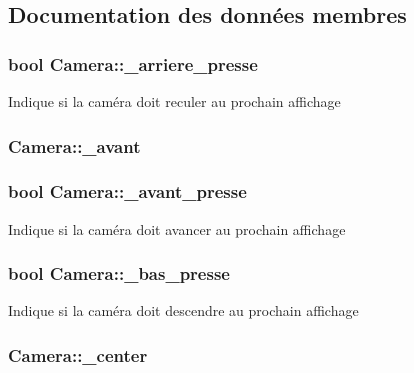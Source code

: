 \subsection{Documentation des données membres}
\hypertarget{class_camera_a0ce12f74953fcd53192e48f8b4164e2e}{
\subsubsection[{\+\_\+arriere\+\_\+presse}]{\setlength{\rightskip}{0pt plus 5cm}bool Camera\+::\+\_\+arriere\+\_\+presse}}\label{class_camera_a0ce12f74953fcd53192e48f8b4164e2e}
Indique si la caméra doit reculer au prochain affichage \hypertarget{class_camera_ab7cf8c1eae6b2f35a20e8abd1f0570c9}{
\subsubsection[{\+\_\+avant}]{ Camera\+::\+\_\+avant\hspace{0.3cm}{\ttfamily [protected]}}}\label{class_camera_ab7cf8c1eae6b2f35a20e8abd1f0570c9}
\hypertarget{class_camera_a4cab15e35a96fdcb2a8599fea13a9b8f}{
\subsubsection[{\+\_\+avant\+\_\+presse}]{\setlength{\rightskip}{0pt plus 5cm}bool Camera\+::\+\_\+avant\+\_\+presse}}\label{class_camera_a4cab15e35a96fdcb2a8599fea13a9b8f}
Indique si la caméra doit avancer au prochain affichage \hypertarget{class_camera_aaba6828f97c9ef07b6b135a665bd3008}{
\subsubsection[{\+\_\+bas\+\_\+presse}]{\setlength{\rightskip}{0pt plus 5cm}bool Camera\+::\+\_\+bas\+\_\+presse}}\label{class_camera_aaba6828f97c9ef07b6b135a665bd3008}
Indique si la caméra doit descendre au prochain affichage \hypertarget{class_camera_ad80a82cbc81e6d8ba04c7cc1ac7ba0d7}{
\subsubsection[{\+\_\+center}]{ Camera\+::\+\_\+center\hspace{0.3cm}{\ttfamily [protected]}}}\label{class_camera_ad80a82cbc81e6d8ba04c7cc1ac7ba0d7}
